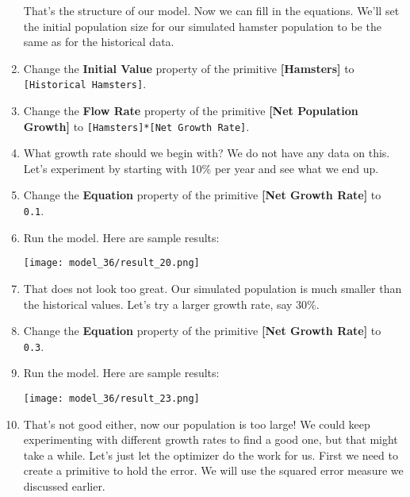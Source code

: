 \documentclass[]{memoir}
\makeatletter
\def\maxwidth{\ifdim\Gin@nat@width>\linewidth\linewidth
\else\Gin@nat@width\fi}
\let\Oldincludegraphics\includegraphics
\renewcommand{\includegraphics}[1]{\Oldincludegraphics[width=\maxwidth]{#1}}
\newcommand{\p}[1]{\textbf{{[}#1{]}}}
\newcommand{\e}[1]{\texttt{#1}}
\renewcommand{\a}[1]{\textbf{#1}}
\makeatother
\begin{document}
\begin{oframed}
\begin{enumerate}
That's the structure of our model. Now we can fill in the equations. We'll set the initial population size for our simulated hamster population to be the same as for the historical data.


\item  Change the \a{Initial Value} property of the primitive \p{Hamsters} to \e{[Historical Hamsters]}.
\item  Change the \a{Flow Rate} property of the primitive \p{Net Population Growth} to \e{[Hamsters]*[Net Growth Rate]}.
\item 

What growth rate should we begin with? We do not have any data on this. Let's experiment by starting with 10\% per year and see what we end up.


\item  Change the \a{Equation} property of the primitive \p{Net Growth Rate} to \e{0.1}.
\item Run the model. Here are sample results:\par \begin{minipage}{\linewidth}  \centering \texttt{[image: model\_36/result\_20.png]}
\end{minipage}
\item 

That does not look too great. Our simulated population is much smaller than the historical values. Let's try a larger growth rate, say 30\%.


\item  Change the \a{Equation} property of the primitive \p{Net Growth Rate} to \e{0.3}.
\item Run the model. Here are sample results:\par \begin{minipage}{\linewidth}  \centering \texttt{[image: model\_36/result\_23.png]}
\end{minipage}
\item 

That's not good either, now our population is too large! We could keep experimenting with different growth rates to find a good one, but that might take a while. Let's just let the optimizer do the work for us. First we need to create a primitive to hold the error. We will use the squared error measure we discussed earlier.



\end{enumerate}
\end{oframed}
\end{document}
